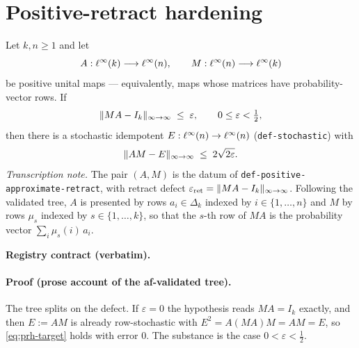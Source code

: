 \section{Positive-retract hardening}\label{sec:prh}

\begin{lemma}\label{lem:prh}
Let $k,n\ge1$ and let
\[
  A:\ell^{\infty}(k)\longrightarrow\ell^{\infty}(n),
  \qquad
  M:\ell^{\infty}(n)\longrightarrow\ell^{\infty}(k)
\]
be positive unital maps --- equivalently, maps whose matrices have probability-vector
rows. If
\[
  \lVert MA-I_k \rVert_{\infty\to\infty}\;\le\;\varepsilon,\qquad 0\le\varepsilon<\tfrac12,
\]
then there is a stochastic idempotent $E:\ell^{\infty}(n)\to\ell^{\infty}(n)$
(\texttt{def-stochastic}) with
\begin{equation}\label{eq:prh-target}
  \lVert AM-E \rVert_{\infty\to\infty}\;\le\;2\sqrt{2\varepsilon}.
\end{equation}
\emph{Transcription note.} The pair $(A,M)$ is the datum of
\texttt{def-positive-approximate-retract}, with retract defect
$\varepsilon_{\mathrm{ret}}=\lVert MA-I_k \rVert_{\infty\to\infty}$. Following the validated tree, $A$ is
presented by rows $a_i\in\Delta_k$ indexed by $i\in\{1,\dots,n\}$ and $M$ by rows
$\mu_s$ indexed by $s\in\{1,\dots,k\}$, so that the $s$-th row of $MA$ is the
probability vector $\sum_i\mu_s(i)\,a_i$.
\end{lemma}

\noindent\textbf{Registry contract (verbatim).}

\paragraph{Proof (prose account of the af-validated tree).}
The tree splits on the defect. If $\varepsilon=0$ the hypothesis reads $MA=I_k$ exactly,
and then $E:=AM$ is already row-stochastic with $E^2=A(MA)M=AM=E$, so
\eqref{eq:prh-target} holds with error $0$. The substance is the case
$0<\varepsilon<\tfrac12$.

